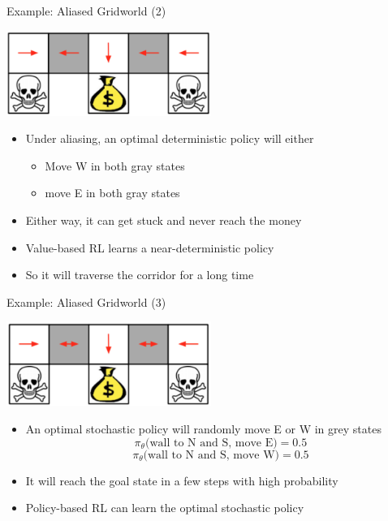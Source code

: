 \begin{frame}[c]{Example: Aliased Gridworld (2)}
	
	\begin{center}
		\includegraphics[width=0.5\textwidth]{images/gridworld2.png}
	\end{center}
	
	\begin{itemize}
		\item Under aliasing, an optimal \alert{deterministic} policy will either
		\begin{itemize}
			\item Move W in both gray states 
			\item move E in both gray states
		\end{itemize}
		\item Either way, it can get stuck and never reach the money
		\item Value-based RL learns a near-deterministic policy
		\item So it will traverse the corridor for a long time
	\end{itemize}

\end{frame}
\begin{frame}[c]{Example: Aliased Gridworld (3)}
	
	\begin{center}
		\includegraphics[width=0.5\textwidth]{images/gridworld3.png}
	\end{center}
	
	\begin{itemize}
		\item An optimal \alert{stochastic} policy will randomly move E or W in grey states
		$$\pi_\theta\text{(wall to N and S, move E)} = 0.5 $$
		$$\pi_\theta\text{(wall to N and S, move W)} = 0.5 $$
		\item It will reach the goal state in a few steps with high probability
		\item Policy-based RL can learn the optimal stochastic policy
	\end{itemize}
	
\end{frame}
